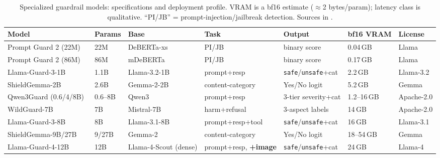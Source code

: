 \begin{table}[t]
\small\centering
\setlength{\tabcolsep}{4pt}
\caption{Specialized guardrail models: specifications and deployment profile. VRAM is a bf16 estimate ($\approx$2 bytes/param); latency class is qualitative. ``PI/JB'' = prompt-injection/jailbreak detection. Sources in .}
\label{tab:guardrail-specs}
\begin{tabular}{lllllll}
\toprule
Model & Params & Base & Task & Output & bf16 VRAM & License \\
\midrule
Prompt Guard 2 (22M)~\cite{meta2025promptguard2} & 22M & DeBERTa-xs & PI/JB & binary score & 0.04\,GB & Llama \\
Prompt Guard 2 (86M)~\cite{meta2025promptguard2} & 86M & mDeBERTa & PI/JB & binary score & 0.17\,GB & Llama \\
Llama-Guard-3-1B~\cite{fedorov2024llamaguard3_1b} & 1.1B & Llama-3.2-1B & prompt+resp & \texttt{safe}/\texttt{unsafe}+cat & 2.2\,GB & Llama-3.2 \\
ShieldGemma-2B~\cite{zeng2024shieldgemma} & 2.6B & Gemma-2-2B & content-category & Yes/No logit & 5.2\,GB & Gemma \\
Qwen3Guard (0.6/4/8B)~\cite{qwen3guard2025} & 0.6--8B & Qwen3 & prompt+resp & 3-tier severity+cat & 1.2--16\,GB & Apache-2.0 \\
WildGuard-7B~\cite{han2024wildguard} & 7B & Mistral-7B & harm+refusal & 3-aspect labels & 14\,GB & Apache-2.0 \\
Llama-Guard-3-8B~\cite{meta2024llamaguard2_3} & 8B & Llama-3.1-8B & prompt+resp+tool & \texttt{safe}/\texttt{unsafe}+cat & 16\,GB & Llama-3.1 \\
ShieldGemma-9B/27B~\cite{zeng2024shieldgemma} & 9/27B & Gemma-2 & content-category & Yes/No logit & 18--54\,GB & Gemma \\
Llama-Guard-4-12B~\cite{meta2025llamaguard4} & 12B & Llama-4-Scout (dense) & prompt+resp, \textbf{+image} & \texttt{safe}/\texttt{unsafe}+cat & 24\,GB & Llama-4 \\
\bottomrule
\end{tabular}
\end{table}

